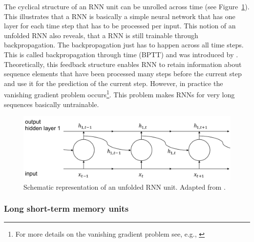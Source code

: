 The cyclical structure of an RNN unit can be unrolled across time (see Figure~\ref{Fig:RNNunfolded}). This illustrates that a RNN is basically a simple neural network that has one layer for each time step that has to be processed per input. This notion of an unfolded RNN also reveals, that a RNN is still trainable through backpropagation. The backpropagation just has to happen across all time steps. This is called backpropagation through time (BPTT) and was introduced by \citet{Werbos:1990}. Theoretically, this feedback structure enables RNN to retain information about sequence elements that have been processed many steps before the current step and use it for the prediction of the current step. However, in practice the vanishing gradient problem occurs\footnote{For more details on the vanishing gradient problem see, e.g., \citet{Bengio:1994}}. This problem makes RNNs for very long sequences basically untrainable.
%
\begin{figure}[htbp]
    \centering
    \includegraphics[scale=0.6]{thesis/figures/RNNunfolded.pdf}
    \caption[Schematic representation of an unfolded RNN unit]{Schematic representation of an unfolded RNN unit. Adapted from \citet{chollet:2018}.}
    \label{Fig:RNNunfolded}
\end{figure}



\subsubsection{Long short-term memory units}

